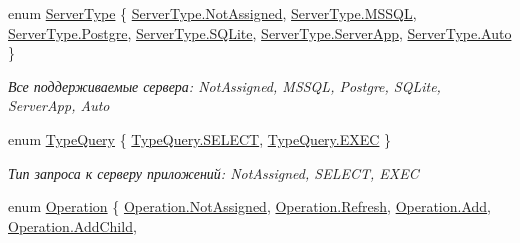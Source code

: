 \begin{DoxyCompactItemize}
enum \mbox{\hyperlink{namespace_f_b_a_a54b34d51226fe01d01f79d9fcb237413}{Server\+Type}} \{ \newline
\mbox{\hyperlink{namespace_f_b_a_a54b34d51226fe01d01f79d9fcb237413a316d54b418d9a7186f9234f08cfb599f}{Server\+Type.\+Not\+Assigned}}, 
\mbox{\hyperlink{namespace_f_b_a_a54b34d51226fe01d01f79d9fcb237413a1d37e2cfa8532be01d3f89c76ccfe4a9}{Server\+Type.\+M\+S\+S\+QL}}, 
\mbox{\hyperlink{namespace_f_b_a_a54b34d51226fe01d01f79d9fcb237413a985e65dc09174c5a3177c0b80570b683}{Server\+Type.\+Postgre}}, 
\mbox{\hyperlink{namespace_f_b_a_a54b34d51226fe01d01f79d9fcb237413a497757a9c5b2ec17ded656170b51c788}{Server\+Type.\+S\+Q\+Lite}}, 
\newline
\mbox{\hyperlink{namespace_f_b_a_a54b34d51226fe01d01f79d9fcb237413a01f5a36d50cbbb5a2300d19c738edb2b}{Server\+Type.\+Server\+App}}, 
\mbox{\hyperlink{namespace_f_b_a_a54b34d51226fe01d01f79d9fcb237413a06b9281e396db002010bde1de57262eb}{Server\+Type.\+Auto}}
 \}
\begin{DoxyCompactList}\small\item\em Все поддерживаемые сервера\+: Not\+Assigned, M\+S\+S\+QL, Postgre, S\+Q\+Lite, Server\+App, Auto \end{DoxyCompactList}\item 
enum \mbox{\hyperlink{namespace_f_b_a_ae3e8e3cf257baeeb6f393380f9abe802}{Type\+Query}} \{ \mbox{\hyperlink{namespace_f_b_a_ae3e8e3cf257baeeb6f393380f9abe802a63225f19fccb18e7c709f1fa11bc738e}{Type\+Query.\+S\+E\+L\+E\+CT}}, 
\mbox{\hyperlink{namespace_f_b_a_ae3e8e3cf257baeeb6f393380f9abe802af28b3aad7d43b371527fde69de8d93ff}{Type\+Query.\+E\+X\+EC}}
 \}
\begin{DoxyCompactList}\small\item\em Тип запроса к серверу приложений\+: Not\+Assigned, S\+E\+L\+E\+CT, E\+X\+EC \end{DoxyCompactList}\item 
enum \mbox{\hyperlink{namespace_f_b_a_a82a9536170086556d110a52b7698a776}{Operation}} \{ \newline
\mbox{\hyperlink{namespace_f_b_a_a82a9536170086556d110a52b7698a776a316d54b418d9a7186f9234f08cfb599f}{Operation.\+Not\+Assigned}}, 
\mbox{\hyperlink{namespace_f_b_a_a82a9536170086556d110a52b7698a776a63a6a88c066880c5ac42394a22803ca6}{Operation.\+Refresh}}, 
\mbox{\hyperlink{namespace_f_b_a_a82a9536170086556d110a52b7698a776aec211f7c20af43e742bf2570c3cb84f9}{Operation.\+Add}}, 
\mbox{\hyperlink{namespace_f_b_a_a82a9536170086556d110a52b7698a776a57de60bdd8fe86847530a0468282acfc}{Operation.\+Add\+Child}}, 
\newline

\end{DoxyCompactItemize}
